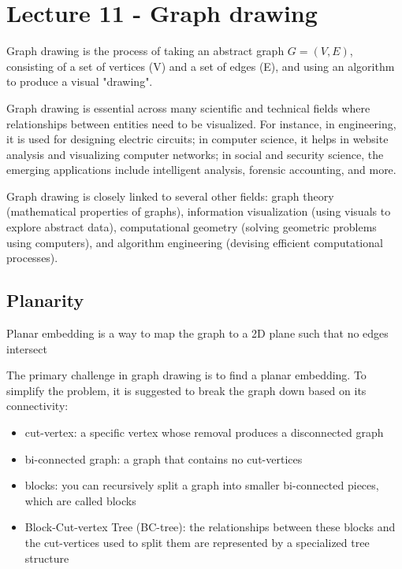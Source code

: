 \chapter{Lecture 11 - Graph drawing}

\begin{definition}
    Graph drawing is the process of taking an abstract graph \(G = (V, E)\), consisting of a set of vertices (V) and a set of edges (E), and using an algorithm to produce a visual "drawing". 
\end{definition}

Graph drawing is essential across many scientific and technical fields where relationships between entities need to be visualized. For instance, in engineering, it is used for designing electric circuits; in computer science, it helps in website analysis and visualizing computer networks; in social and security science, the emerging applications include intelligent analysis, forensic accounting, and more.\par
Graph drawing is closely linked to several other fields: graph theory (mathematical properties of graphs), information visualization (using visuals to explore abstract data), computational geometry (solving geometric problems using computers), and algorithm engineering (devising efficient computational processes). \par

\section{Planarity}

\begin{definition}
    Planar embedding is a way to map the graph to a 2D plane such that no edges intersect
\end{definition}

The primary challenge in graph drawing is to find a planar embedding. To simplify the problem, it is suggested to break the graph down based on its connectivity:
\begin{itemize}[noitemsep]
    \item cut-vertex: a specific vertex whose removal produces a disconnected graph
    \item bi-connected graph: a graph that contains no cut-vertices
    \item blocks: you can recursively split a graph into smaller bi-connected pieces, which are called blocks
    \item Block-Cut-vertex Tree (BC-tree): the relationships between these blocks and the cut-vertices used to split them are represented by a specialized tree structure
\end{itemize}

